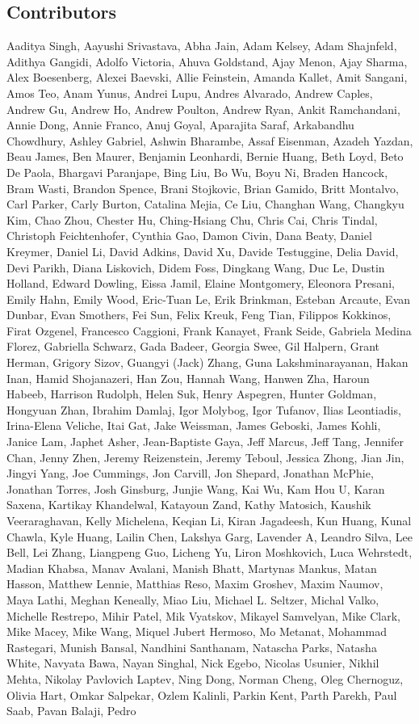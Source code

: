 \documentclass[dvipsnames]{fairmeta}
\begin{document}
\subsection*{Contributors}
Aaditya Singh, Aayushi Srivastava, Abha Jain, Adam Kelsey, Adam Shajnfeld, Adithya Gangidi, Adolfo Victoria, Ahuva Goldstand, Ajay Menon, Ajay Sharma, Alex Boesenberg, Alexei Baevski, Allie Feinstein, Amanda Kallet, Amit Sangani, Amos Teo, Anam Yunus, Andrei Lupu, Andres Alvarado, Andrew Caples, Andrew Gu, Andrew Ho, Andrew Poulton, Andrew Ryan, Ankit Ramchandani, Annie Dong, Annie Franco, Anuj Goyal, Aparajita Saraf, Arkabandhu Chowdhury, Ashley Gabriel, Ashwin Bharambe, Assaf Eisenman, Azadeh Yazdan, Beau James, Ben Maurer, Benjamin Leonhardi, Bernie Huang, Beth Loyd, Beto De Paola, Bhargavi Paranjape, Bing Liu, Bo Wu, Boyu Ni, Braden Hancock, Bram Wasti, Brandon Spence, Brani Stojkovic, Brian Gamido, Britt Montalvo, Carl Parker, Carly Burton, Catalina Mejia, Ce Liu, Changhan Wang, Changkyu Kim, Chao Zhou, Chester Hu, Ching-Hsiang Chu, Chris Cai, Chris Tindal, Christoph Feichtenhofer, Cynthia Gao, Damon Civin, Dana Beaty, Daniel Kreymer, Daniel Li,  David Adkins, David Xu, Davide Testuggine, Delia David, Devi Parikh, Diana Liskovich, Didem Foss, Dingkang Wang, Duc Le, Dustin Holland, Edward Dowling, Eissa Jamil, Elaine Montgomery, Eleonora Presani, Emily Hahn, Emily Wood, Eric-Tuan Le, Erik Brinkman, Esteban Arcaute, Evan Dunbar, Evan Smothers, Fei Sun, Felix Kreuk, Feng Tian, Filippos Kokkinos, Firat Ozgenel, Francesco Caggioni, Frank Kanayet, Frank Seide, Gabriela Medina Florez, Gabriella Schwarz, Gada Badeer, Georgia Swee, Gil Halpern, Grant Herman, Grigory Sizov, Guangyi (Jack) Zhang, Guna Lakshminarayanan, Hakan Inan, Hamid Shojanazeri, Han Zou, Hannah Wang, Hanwen Zha, Haroun Habeeb, Harrison Rudolph, Helen Suk, Henry Aspegren, Hunter Goldman, Hongyuan Zhan, Ibrahim Damlaj, Igor Molybog, Igor Tufanov, Ilias Leontiadis, Irina-Elena Veliche, Itai Gat, Jake Weissman, James Geboski, James Kohli, Janice Lam, Japhet Asher, Jean-Baptiste Gaya, Jeff Marcus, Jeff Tang, Jennifer Chan, Jenny Zhen, Jeremy Reizenstein, Jeremy Teboul, Jessica Zhong, Jian Jin, Jingyi Yang, Joe Cummings, Jon Carvill, Jon Shepard, Jonathan McPhie, Jonathan Torres, Josh Ginsburg, Junjie Wang, Kai Wu, Kam Hou U, Karan Saxena, Kartikay Khandelwal, Katayoun Zand, Kathy Matosich, Kaushik Veeraraghavan, Kelly Michelena, Keqian Li, Kiran Jagadeesh, Kun Huang, Kunal Chawla, Kyle Huang, Lailin Chen, Lakshya Garg, Lavender A, Leandro Silva, Lee Bell, Lei Zhang, Liangpeng Guo, Licheng Yu, Liron Moshkovich, Luca Wehrstedt, Madian Khabsa, Manav Avalani, Manish Bhatt, Martynas Mankus, Matan Hasson, Matthew Lennie, Matthias Reso, Maxim Groshev, Maxim Naumov, Maya Lathi, Meghan Keneally, Miao Liu, Michael L. Seltzer, Michal Valko, Michelle Restrepo, Mihir Patel, Mik Vyatskov, Mikayel Samvelyan, Mike Clark, Mike Macey, Mike Wang, Miquel Jubert Hermoso, Mo Metanat, Mohammad Rastegari, Munish Bansal, Nandhini Santhanam, Natascha Parks, Natasha White, Navyata Bawa, Nayan Singhal, Nick Egebo, Nicolas Usunier, Nikhil Mehta, Nikolay Pavlovich Laptev, Ning Dong, Norman Cheng, Oleg Chernoguz, Olivia Hart, Omkar Salpekar, Ozlem Kalinli, Parkin Kent, Parth Parekh, Paul Saab, Pavan Balaji, Pedro 
\end{document}

